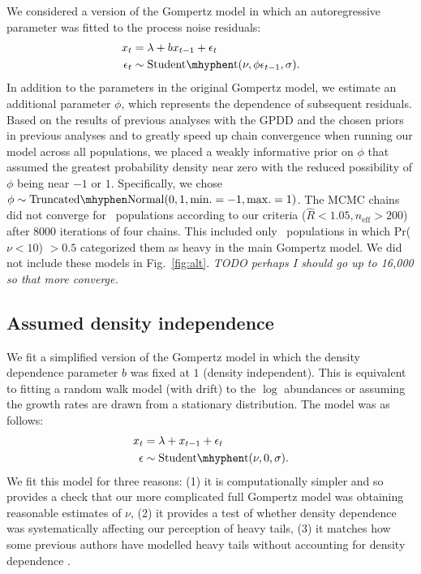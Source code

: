 We considered a version of the Gompertz model in which an autoregressive
parameter was fitted to the process noise residuals:
\begin{align*}
x_t &= \lambda + b x_{t-1} + \epsilon_t\\
\epsilon_t &\sim \mathrm{Student\mhyphen t}(\nu, \phi \epsilon_{t-1}, \sigma).
\end{align*}
In addition to the parameters in the original Gompertz model, we estimate an additional parameter $\phi$, which represents the dependence of subsequent residuals. Based on the results of previous analyses with the GPDD \citep[e.g.][]{connors2014} and the chosen priors in previous analyses \citep[e.g.][]{thorson2014a} and to greatly speed up chain convergence when running our model across all populations, we placed a weakly informative prior on $\phi$ that assumed the greatest probability density near zero with the reduced possibility of $\phi$ being near $-1$ or $1$. Specifically, we chose $\phi \sim \mathrm{Truncated\mhyphen Normal}(0, 1, \mathrm{min.} = -1, \mathrm{max.} = 1)$. The MCMC chains did not converge for \modelsNoConvergeAROne\ populations according to our criteria ($\widehat{R} < 1.05, n_\mathrm{eff} > 200$) after 8000 iterations of four chains. This included only \modelsNoConvergeAROneHeavyBase\ populations in which Pr($\nu < 10$) $> 0.5$ categorized them as heavy in the main Gompertz model. We did not include these models in Fig.~\ref{fig:alt}. \textit{TODO perhaps I should go up to 16,000 so that more converge.}

\subsection{Assumed density independence}\label{assumed-density-independence}

We fit a simplified version of the Gompertz model in which the density dependence parameter $b$ was fixed at $1$ (density independent). This is equivalent to fitting a random walk model (with drift) to the $\log$ abundances or assuming the growth rates are drawn from a stationary distribution. The model was as follows:
\begin{align*}
x_t &= \lambda + x_{t-1} + \epsilon_t\\
\epsilon &\sim \mathrm{Student\mhyphen t}(\nu, 0, \sigma).
\end{align*}
We fit this model for three reasons: (1) it is computationally simpler and so provides a check that our more complicated full Gompertz model was obtaining reasonable estimates of $\nu$, (2) it provides a test of whether density dependence was systematically affecting our perception of heavy tails, (3) it matches how some previous authors have modelled heavy tails without accounting for density dependence \citep{segura2013}.

